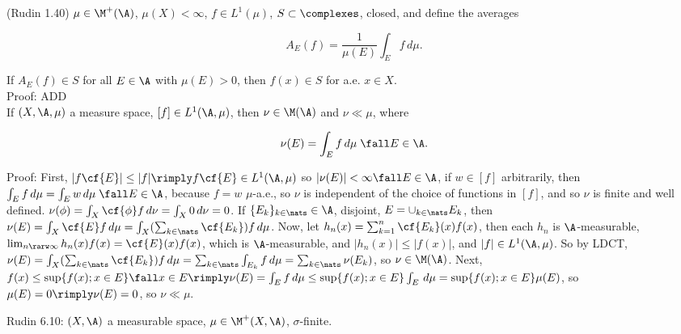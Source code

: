 \vspace{20pt}

(Rudin 1.40) $\mu \in \M^+(\A)$, $\mu(X) < \infty$, $f \in L^1(\mu)$, $S \subset \complexes$, closed, and define the averages

$$
A_E(f) = \frac{1}{\mu(E)}  \int_E f \, d\mu.
$$

\noindent
If $A_E(f) \in S$ for all $E \in \A$ with $\mu(E) > 0$, then $f(x) \in S$ for a.e. $x \in X$.\\


\noindent
Proof: ADD \\








If $(X, \A, \mu)$ a measure space, $[f] \in L^1(\A,\mu)$, then $\nu \in \M(\A)$ and $\nu \ll \mu$, where

$$ \nu(E) = \int_E f \, d\mu \; \fall E \in \A.$$

\noindent
Proof: First, $|f \cf{E}| \le |f| \rimply f \cf{E} \in  L^1(\A,\mu)$ so $|\nu(E)| < \infty \fall E \in \A$, if $w \in [f]$ arbitrarily, then $\int_E f \, d\mu = \int_E w \, d\mu  \; \fall E \in \A $, because $f = w$ $\mu$-a.e., so $\nu$ is independent of the choice of functions in $[f]$, and so $\nu$ is finite and well defined. $\nu(\phi) = \int_X \cf{\phi} f \, d\nu = \int_X 0 \, d\nu = 0$. If $\{ E_k \}_{k \in \nats} \in \A$, disjoint, $E  = \cup_{k \in \nats} E_k$, then $\nu(E) = \int_X \cf{E} f \, d\mu = \int_X ( \sum_{k \in \nats} \cf{E_k} ) f \, d\mu$. Now, let $h_n(x) = \sum_{k=1}^n \cf{E_k}(x) f(x)$, then each $h_n$ is $\A$-measurable, $\lim_{n \rarw \infty} h_n(x) f(x) = \cf{E}(x) f(x)$, which is $\A$-measurable, and $|h_n(x)| \le |f(x)|$, and $|f| \in L^1(\A, \mu)$. So by LDCT, $\nu(E) = \int_X ( \sum_{k \in \nats} \cf{E_k} ) f \, d\mu  =  \sum_{k \in \nats} \int_{E_k}  f \, d\mu = \sum_{k \in \nats} \nu(E_k)$, so $\nu \in \M(\A)$. Next, $f(x) \le \sup \{ f(x); x \in E \} \fall x \in E \rimply \nu(E) = \int_E f \, d\mu \le \sup \{ f(x); x \in E \} \int_E \, d\mu = \sup \{ f(x); x \in E \} \mu(E)$, so $\mu(E) = 0 \rimply \nu(E) = 0$, so $\nu \ll \mu$.









\break

Rudin 6.10: $(X, \A)$ a measurable space, $\mu \in \M^+(X, \A)$, $\sigma$-finite. \\


